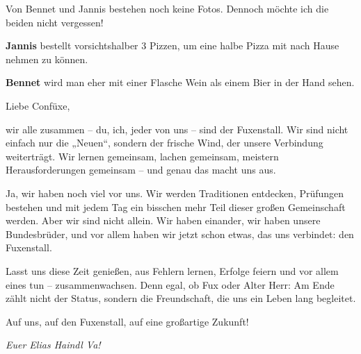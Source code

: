 \begin{multicols}{2}


Von Bennet und Jannis bestehen noch keine Fotos. Dennoch möchte
ich die beiden nicht vergessen!



\textbf{Jannis} bestellt vorsichtshalber 3 Pizzen, um eine halbe
Pizza mit nach Hause nehmen zu können.



\textbf{Bennet} wird man eher mit einer Flasche Wein als einem Bier
in der Hand sehen.



Liebe Confüxe,



wir alle
zusammen – du, ich, jeder von uns – sind der Fuxenstall. Wir sind nicht einfach
nur die „Neuen“,
sondern der frische Wind, der unsere Verbindung weiterträgt. Wir lernen
gemeinsam, lachen gemeinsam, meistern Herausforderungen gemeinsam – und genau
das macht uns aus.



Ja, wir haben
noch viel vor uns. Wir werden Traditionen entdecken, Prüfungen bestehen und mit
jedem Tag ein bisschen mehr Teil dieser großen Gemeinschaft werden. Aber wir
sind nicht allein. Wir haben einander, wir haben unsere Bundesbrüder, und vor
allem haben wir jetzt schon etwas, das uns verbindet: den Fuxenstall.



Lasst uns diese
Zeit genießen, aus Fehlern lernen, Erfolge feiern und vor allem eines tun – zusammenwachsen.
Denn egal, ob Fux oder Alter Herr: Am Ende zählt nicht der Status, sondern die
Freundschaft, die uns ein Leben lang begleitet.



Auf uns, auf den
Fuxenstall, auf eine großartige Zukunft!






	\begin{flushright}
		\hfill\emph{Euer Elias Haindl Va!}
	\end{flushright}
\end{multicols}


